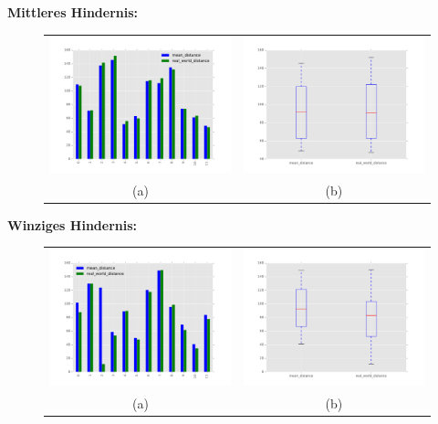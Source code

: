 	\noindent
	\textbf{Mittleres Hindernis:}\\


	\begin{figure}[h]
		\centering
		\begin{tabular}{cc}
		\includegraphics[width=7cm]{img/evaluation/sample_medium_bar}&
		\includegraphics[width=7cm]{img/evaluation/sample_medium_box}\\
		 (a) & (b)
		\end{tabular}
		\caption{}
	    \label{fig:sample_eval_big}
	\end{figure}

	\noindent
	\textbf{Winziges Hindernis:}\\


	\begin{figure}[h]
		\centering
		\begin{tabular}{cc}
		\includegraphics[width=7cm]{img/evaluation/sample_tiny_bar}&
		\includegraphics[width=7cm]{img/evaluation/sample_tiny_box}\\
		 (a) & (b)
		\end{tabular}
		\caption{}
	    \label{fig:sample_eval_big}
	\end{figure}

